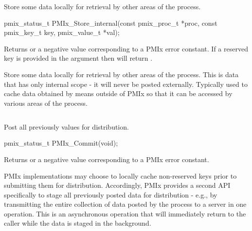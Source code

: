 Store some data locally for retrieval by other areas of the process.

\format

\cspecificstart
\begin{codepar}
pmix_status_t
PMIx_Store_internal(const pmix_proc_t *proc,
                    const pmix_key_t key,
                    pmix_value_t *val);
\end{codepar}
\cspecificend

\begin{arglist}
\end{arglist}

Returns  or a negative value corresponding to a PMIx error constant.
If a reserved key is provided in the  argument then  will return .

\descr

Store some data locally for retrieval by other areas of the process.
This is data that has only internal scope - it will never be posted externally. Typically used to cache data obtained by means outside of \ac{PMIx} so that it can be accessed by various areas of the process.


\subsection{}

\summary

Post all previously  values for distribution.

\format

\cspecificstart
\begin{codepar}
pmix_status_t PMIx_Commit(void);
\end{codepar}
\cspecificend

Returns  or a negative value corresponding to a PMIx error constant.

\descr

\ac{PMIx} implementations may choose to locally cache non-reserved keys prior to submitting them for distribution. Accordingly, \ac{PMIx} provides a second \ac{API} specifically to stage all previously posted data for distribution - e.g., by transmitting the entire collection of data posted by the process to a server in one operation. This is an asynchronous operation that will immediately return to the caller while the data is staged in the background.

